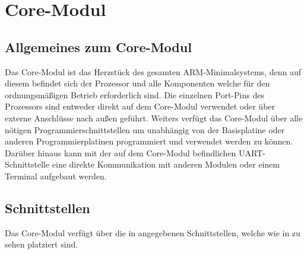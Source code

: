 \section{Core-Modul}
\label{sec:coremodul}


\subsection{Allgemeines zum Core-Modul}
\label{sec:coremodul-allgemeines}

Das \gls{Core-Modul} ist das Herzstück des gesamten \gls{ARM}-\gls{Minimalsystem}s, denn auf diesem befindet sich der Prozessor und alle Komponenten welche für den ordnungsmäßigen Betrieb erforderlich sind. Die einzelnen Port-Pins des Prozessors sind entweder direkt auf dem \gls{Core-Modul} verwendet oder über externe Anschlüsse nach außen geführt. Weiters verfügt das \gls{Core-Modul} über alle nötigen Programmierschnittstellen um unabhängig von der \gls{Basisplatine} oder anderen Programmierplatinen programmiert und verwendet werden zu können. Darüber hinaus kann mit der auf dem \gls{Core-Modul} befindlichen UART-Schnittstelle eine direkte Kommunikation mit anderen Modulen oder einem Terminal aufgebaut werden.

\subsection{Schnittstellen}
\label{sec:coremodul-schnittstellen}

Das \gls{Core-Modul} verfügt über die in  angegebenen Schnittstellen, welche wie in  zu sehen platziert sind.



